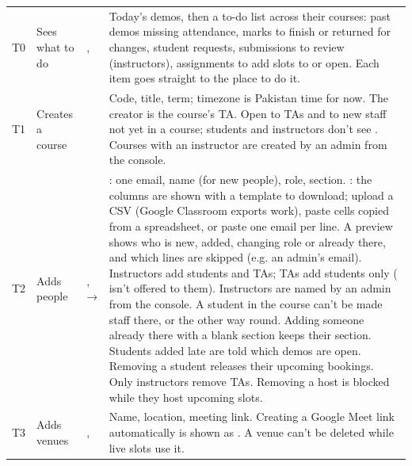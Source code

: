 {\tablefont
\begin{xltabular}{\linewidth}{@{}l P{34mm} P{30mm} L@{}}
  \toprule
  \thead{\#} &  &  & \\
  \midrule
  \endhead
  T0 & Sees what to do & ,  & Today's demos, then a to-do list across their courses: past demos missing attendance, marks to finish or returned for changes, student requests, submissions to review (instructors), assignments to add slots to or open. Each item goes straight to the place to do it.\\
  T1 & Creates a course &  & Code, title, term; timezone is Pakistan time for now. The creator is the course's TA. Open to TAs and to new staff not yet in a course; students and instructors don't see . Courses with an instructor are created by an admin from the console.\\
  T2 & Adds people & ,  →  & : one email, name (for new people), role, section. : the columns are shown with a template to download; upload a CSV (Google Classroom exports work), paste cells copied from a spreadsheet, or paste one email per line. A preview shows who is new, added, changing role or already there, and which lines are skipped (e.g. an admin's email). Instructors add students and TAs; TAs add students only ( isn't offered to them). Instructors are named by an admin from the console. A student in the course can't be made staff there, or the other way round. Adding someone already there with a blank section keeps their section. Students added late are told which demos are open. Removing a student releases their upcoming bookings. Only instructors remove TAs. Removing a host is blocked while they host upcoming slots.\\
  T3 & Adds venues & ,  & Name, location, meeting link. Creating a Google Meet link automatically is shown as . A venue can't be deleted while live slots use it.\\

\end{xltabular}}

